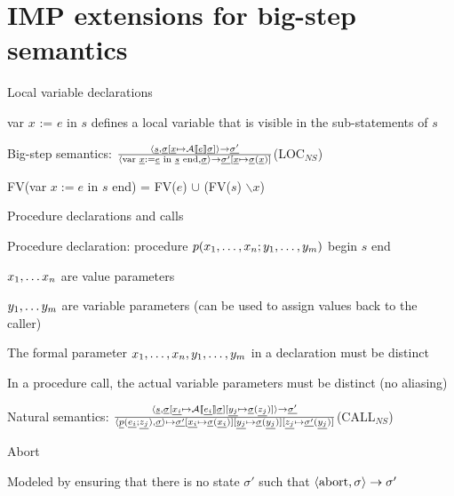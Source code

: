 \section{IMP extensions for big-step semantics}
\enumstart
	\item Local variable declarations
	\enumstart
		\item var $x$ := $e$ in $s$ defines a local variable that is visible in the sub-statements of $s$
		\item Big-step semantics: $\frac{\langle \underline{s}, \underline{\sigma}[\underline{x} \mapsto \mathcal{A}\llbracket \underline{e} \rrbracket \underline{\sigma}] \rangle \rightarrow \underline{\sigma'}}{\langle \text{var }\underline{x} := \underline{e} \text{ in }\underline{s}\text{ end}, \underline{\sigma} \rangle \rightarrow \underline{\sigma'}[\underline{x} \mapsto \underline{\sigma}(\underline{x})]}$(LOC$_{NS}$)
		\item FV(var $x := e$ in $s$ end) = FV($e$) $\cup$ (FV($s$) $\smallsetminus x$)
	\enumend
	\item Procedure declarations and calls
	\enumstart
		\item Procedure declaration: procedure $p(x_1, \mathellipsis, x_n; y_1, \mathellipsis, y_m)$ begin $s$ end
		\item $x_1, \mathellipsis x_n$ are value parameters
		\item $y_1, \mathellipsis y_m$ are variable parameters (can be used to assign values back to the caller)
		\item The formal parameter $x_1, \mathellipsis, x_n, y_1, \mathellipsis, y_m$ in a declaration must be distinct
		\item In a procedure call, the actual variable parameters must be distinct (no aliasing)
		\item Natural semantics: $\frac{\langle \underline{s}, \underline{\sigma}[\underline{x_i} \mapsto \mathcal{A}\llbracket \underline{e_i} \rrbracket \underline{\sigma} ][\underline{y_j} \mapsto \underline{\sigma}(\underline{z_j})] \rangle \rightarrow \underline{\sigma'}}{\langle \underline{p}(\underline{e_i}; \underline{z_j}), \underline{\sigma} \rangle \mapsto \underline{\sigma'}[\underline{x_i} \mapsto \underline{\sigma}(\underline{x_i})][\underline{y_j} \mapsto \underline{\sigma}(\underline{y_j})][\underline{z_j} \mapsto \underline{\sigma'}(\underline{y_j})]}$(CALL$_{NS}$)
	\enumend
	\item Abort
	\enumstart
		\item Modeled by ensuring that there is no state $\sigma'$ such that $\langle \text{abort}, \sigma \rangle \rightarrow \sigma'$
